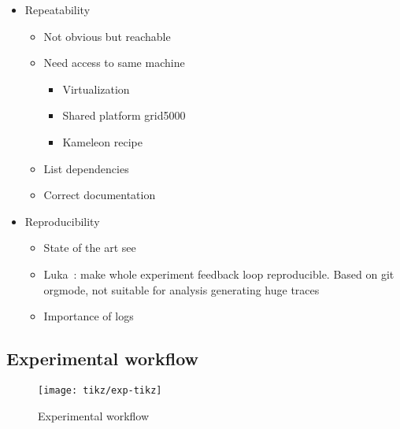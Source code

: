 \begin{itemize}
    \item Repeatability
        \begin{itemize}
            \item Not obvious but reachable
            \item Need access to same machine
                \begin{itemize}
                    \item Virtualization
                    \item Shared platform grid5000~\cite{Cappello05Grid5000}
                    \item Kameleon recipe~\cite{Ruiz15Reconstructable}
                \end{itemize}
            \item List dependencies
            \item Correct documentation
        \end{itemize}
    \item Reproducibility
        \begin{itemize}
            \item State of the art see \cite[Chapter~3, p17-19]{Stanisic15Reproducible}
            \item Luka~\cite[Chapter~4, p31-44]{Stanisic15Reproducible}: make whole experiment feedback
                loop reproducible. Based on git orgmode, not suitable for analysis
                generating huge traces
            \item Importance of logs
        \end{itemize}
\end{itemize}



\subsection{Experimental workflow}

\begin{figure}[htb]
    \centering
    \texttt{[image: tikz/exp-tikz]}
    \caption{Experimental workflow}
    \label{fig:exp}
\end{figure}

